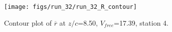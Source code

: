 \begin{figure}[H]
\centering
\texttt{[image: figs/run\_32/run\_32\_R\_contour]}
\caption{Contour plot of $\overline{r}$ at $z/c$=8.50, $V_{free}$=17.39, station 4.}
\label{fig:run_32_R_contour}
\end{figure}


